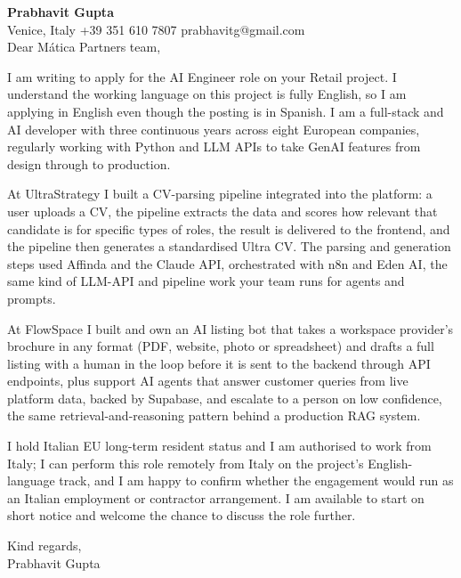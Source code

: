 \documentclass[a4paper,10.5pt]{article}
\begin{document}
\textbf{Prabhavit Gupta}\\
Venice, Italy \textbar{} +39 351 610 7807 \textbar{} prabhavitg@gmail.com\\[10pt]
Dear Mática Partners team,

I am writing to apply for the AI Engineer role on your Retail project. I understand the working language on this project is fully English, so I am applying in English even though the posting is in Spanish. I am a full-stack and AI developer with three continuous years across eight European companies, regularly working with Python and LLM APIs to take GenAI features from design through to production.

At UltraStrategy I built a CV-parsing pipeline integrated into the platform: a user uploads a CV, the pipeline extracts the data and scores how relevant that candidate is for specific types of roles, the result is delivered to the frontend, and the pipeline then generates a standardised Ultra CV. The parsing and generation steps used Affinda and the Claude API, orchestrated with n8n and Eden AI, the same kind of LLM-API and pipeline work your team runs for agents and prompts.

At FlowSpace I built and own an AI listing bot that takes a workspace provider's brochure in any format (PDF, website, photo or spreadsheet) and drafts a full listing with a human in the loop before it is sent to the backend through API endpoints, plus support AI agents that answer customer queries from live platform data, backed by Supabase, and escalate to a person on low confidence, the same retrieval-and-reasoning pattern behind a production RAG system.

I hold Italian EU long-term resident status and I am authorised to work from Italy; I can perform this role remotely from Italy on the project's English-language track, and I am happy to confirm whether the engagement would run as an Italian employment or contractor arrangement. I am available to start on short notice and welcome the chance to discuss the role further.

Kind regards,\\
Prabhavit Gupta
\end{document}
